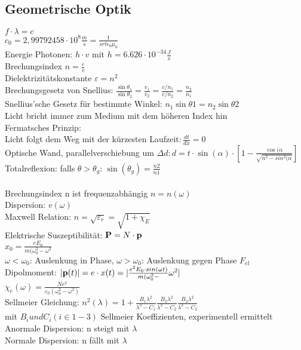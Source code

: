 \documentclass[fs, footer]{latex4ei}
\begin{document}
\begin{multicols*}{4}
\subsection{Geometrische Optik}
$f\cdot\lambda = c$\\
$c_0=2,99792458\cdot 10^8 \frac{m}{s} = \frac{1}{srt{\epsilon_0 \mu_0}}$\\
Energie Photonen: $h\cdot v$ mit $h=6.626\cdot10^{-34}\frac{J}{s}$\\
Brechungsindex $n = \frac{c}{v}$\\
Dielektrizitätskonstante $\varepsilon = n^2 $\\
 Brechungsgesetz von Snellius: $\frac{\sin\theta_1}{\sin\theta_2} = \frac{v_1}{v_2}  = \frac{c/n_1}{c/n_2} = \frac{n_2}{n_1}$\\
Snellius'sche Gesetz für bestimmte Winkel: $n_1\sin\theta 1 = n_2\sin\theta 2$\\
Licht bricht immer zum Medium mit dem höheren Index hin\\
Fermatsches Prinzip:\\
Licht folgt dem Weg mit der kürzesten Laufzeit$: \frac{dt}{dx} = 0$\\
Optische Wand, parallelverschiebung um $\Delta d: d = t\cdot\sin(\alpha)\cdot[1-\frac{\cos(\alpha}{\sqrt{n^2-sin^2(\alpha}}]$\\ %
Totalreflexion: falls $\theta>\theta_g$: $\sin(\theta_g) = \frac{n2}{n1}$\\
\\Brechungsindex n ist frequenzabhängig $n = n(\omega)$\\
Dispersion: $v(\omega)$\\
Maxwell Relation: $n = \sqrt{\varepsilon_r} = \sqrt{1+\chi_E}$\\
Elektrische Suszeptibilität: $\textbf{P} = N \cdot \textbf{p}$\\%
$x_0 = \frac{eE_0}{m(\omega_0^2-\omega^2}$\\
$\omega < \omega_0$: Auslenkung in Phase,
$\omega > \omega_0$: Auslenkung gegen Phase $F_{el}$\\
Dipolmoment: $|\textbf{p}(t)| = e\cdot x(t) = | \frac{e^2E_0\cdot sin(\omega t)}{m(\omega_0^2-}\omega^2|$\\ %
$\chi _e(\omega) = \frac{Ne^2}{\varepsilon_0(\omega_0^2 - \omega^2)}$\\
Sellmeier Gleichung: $n^2(\lambda) = 1 + \frac{B_1\lambda^2}{\lambda^2-C_1}\frac{B_2\lambda^2}{\lambda^2-C_2}\frac{B_2\lambda^2}{\lambda^2-C_2}$\\ mit $B_i und C_i (i \in 1-3)$ Sellmeier Koeffizienten, experimentell ermittelt\\
Anormale Dispersion: n steigt mit $\lambda$\\
Normale Dispersion: n fällt mit $\lambda$\\

\end{multicols*}
\end{document}
